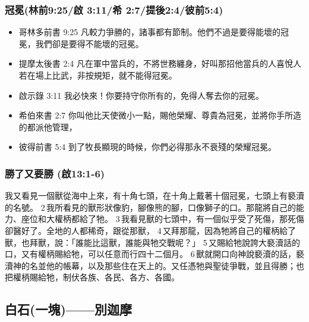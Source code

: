 \subsubsection{冠冕(林前9:25/啟 3:11/希 2:7/提後2:4/彼前5:4)}
\begin{itemize}
\itemsep-.25em
\item 哥林多前書 9:25 凡較力爭勝的，諸事都有節制。他們不過是要得能壞的冠冕，我們卻是要得不能壞的冠冕。
\item 提摩太後書 2:4 凡在軍中當兵的，不將世務纏身，好叫那招他當兵的人喜悅人若在場上比武，非按規矩，就不能得冠冕。
\item 啟示錄 3:11 我必快來！你要持守你所有的，免得人奪去你的冠冕。
\item 希伯來書 2:7 你叫他比天使微小一點，賜他榮耀、尊貴為冠冕，並將你手所造的都派他管理，
\item 彼得前書 5:4 到了牧長顯現的時候，你們必得那永不衰殘的榮耀冠冕。
\end{itemize}
\subsubsection{勝了又要勝 (啟13:1-6)}
我又看見一個獸從海中上來，有十角七頭，在十角上戴著十個冠冕，七頭上有褻瀆的名號。 2 我所看見的獸形狀像豹，腳像熊的腳，口像獅子的口。那龍將自己的能力、座位和大權柄都給了牠。 3 我看見獸的七頭中，有一個似乎受了死傷，那死傷卻醫好了。全地的人都稀奇，跟從那獸， 4 又拜那龍，因為牠將自己的權柄給了獸，也拜獸，說：「誰能比這獸，誰能與牠交戰呢？」 5 又賜給牠說誇大褻瀆話的口，又有權柄賜給牠，可以任意而行四十二個月。 6 獸就開口向神說褻瀆的話，褻瀆神的名並他的帳幕，以及那些住在天上的。又任憑牠與聖徒爭戰，並且得勝；也把權柄賜給牠，制伏各族、各民、各方、各國。






\subsection{白石(一塊)——別迦摩}

